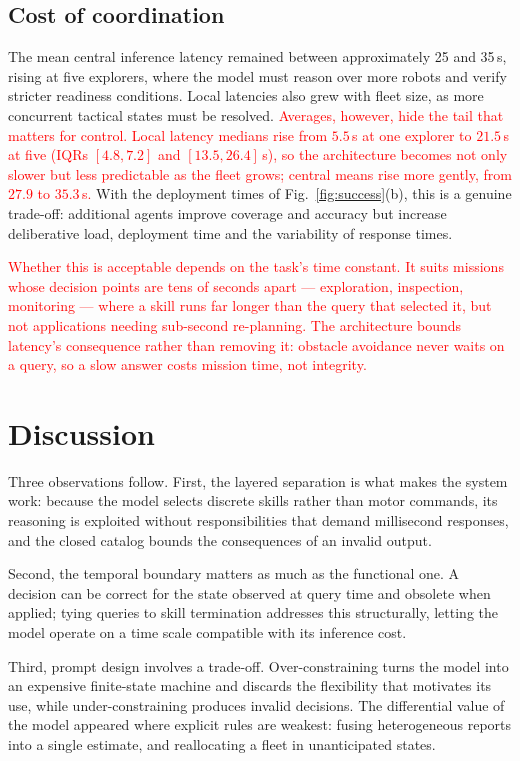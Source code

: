 \documentclass[conference]{IEEEtran}
\newif\ifrevmarks\revmarkstrue
\newcommand{\rev}[1]{\ifrevmarks\textcolor{red}{#1}\else#1\fi}
\begin{document}
\subsection{Cost of coordination}

The mean central inference latency remained between approximately 25 and
35\,s, rising at five explorers, where the model must reason over more
robots and verify stricter readiness conditions. Local latencies also
grew with fleet size, as more concurrent tactical states must be
resolved.
\rev{Averages, however, hide the tail that matters for control. Local
latency medians rise from $5.5$\,s at one explorer to $21.5$\,s at five
(IQRs $[4.8,7.2]$ and $[13.5,26.4]$\,s), so the architecture becomes not
only slower but less predictable as the fleet grows; central means rise
more gently, from $27.9$ to $35.3$\,s.} With the deployment times of
Fig.~\ref{fig:success}(b), this is a genuine trade-off: additional agents
improve coverage and accuracy but increase deliberative load, deployment
time and the variability of response times.

\rev{Whether this is acceptable depends on the task's time constant. It
suits missions whose decision points are tens of seconds apart ---
exploration, inspection, monitoring --- where a skill runs far longer
than the query that selected it, but not applications needing sub-second
re-planning. The architecture bounds latency's consequence rather than
removing it: obstacle avoidance never waits on a query, so a slow answer
costs mission time, not integrity.}

\section{Discussion}
\label{sec:discussion}

Three observations follow. First, the layered separation is what makes
the system work: because the model selects discrete skills rather than
motor commands, its reasoning is exploited without responsibilities that
demand millisecond responses, and the closed catalog bounds the consequences of an invalid output.

Second, the temporal boundary matters as much as the functional one. A
decision can be correct for the state observed at query time and obsolete
when applied; tying queries to skill termination addresses this
structurally, letting the model operate on a time scale compatible with
its inference cost.

Third, prompt design involves a trade-off. Over-constraining turns the
model into an expensive finite-state machine and discards the flexibility
that motivates its use, while under-constraining produces invalid
decisions. The differential value of the model appeared where explicit
rules are weakest: fusing heterogeneous reports into a single estimate,
and reallocating a fleet in unanticipated states.
\end{document}
